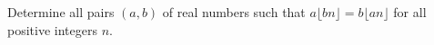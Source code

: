 Determine all pairs $(a,b)$ of real numbers such that $a \lfloor bn \rfloor =b \lfloor an \rfloor $ for all positive integers $n$.
